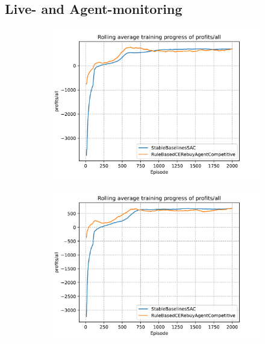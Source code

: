\subsection*{Live- and Agent-monitoring}\label{subsec:LiveMonitoringResults}

\begin{figure}[t]
	\centering
	\begin{subfigure}{0.49\textwidth}
		\centering
		\includegraphics[width = \textwidth]{images/experiments/SACDuopoly/SACDuopolyProfitsMean1.pdf}\\
		\label{fig:SACDuopolyProfitsMean1}
	\end{subfigure}
	\begin{subfigure}{0.49\textwidth}
		\centering
		\includegraphics[width = \textwidth]{images/experiments/SACDuopoly/SACDuopolyProfitsMean2.pdf}\\

\end{subfigure}
\end{figure}
